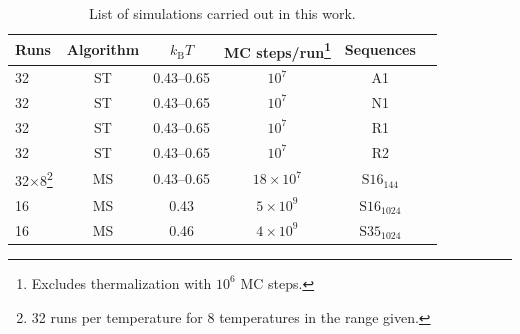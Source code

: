 \documentclass[%
 aip,
rsi,%
 amsmath,amssymb,
 reprint,%
]{revtex4-1}
\newcommand	 {\kb}		{{k_\mathrm{B}}}
\begin{document}
\begin{table}
\caption{\label{tab2} List of simulations carried out in this work. }
\begin{ruledtabular}
\begin{tabular}{lccccr}
Runs & Algorithm & $\kb T$  & MC steps/run\footnote{Excludes thermalization with $10^6$ MC steps.} &  Sequences\\
\hline
32 & ST & 0.43--0.65 & $10^7$ &A1\\ 
32 & ST & 0.43--0.65 & $10^7$ &N1\\ 
32 & ST & 0.43--0.65 & $10^7$ &R1\\ 
32 & ST & 0.43--0.65 & $10^7$ &R2\\ 
32$\times$8\footnote{32  runs per temperature for 8 temperatures in the range given.} & MS &0.43--0.65& $18\times 10^7$ & $\mathrm{S16}_{144}$\\
16 & MS & 0.43  & $5\times 10^9$ &  $\mathrm{S16}_{1024}$ \\
16 & MS & 0.46 & $4\times 10^9$ &  $\mathrm{S35}_{1024}$ \\
\end{tabular}
\end{ruledtabular}
\end{table}
\end{document}
